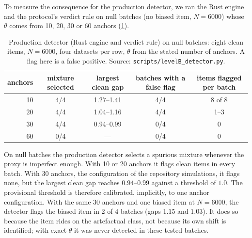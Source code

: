To measure the consequence for the production detector, we ran the Rust engine and the
protocol's verdict rule on null batches (no biased item, $N=6000$) whose $\theta$ comes from 10,
20, 30 or 60 anchors (\cref{tab:anchors}).

\begin{table}[t]
\centering\small
\caption{Production detector (Rust engine and verdict rule) on null batches: eight clean items,
$N=6000$, four datasets per row, $\theta$ from the stated number of anchors. A flag here is a
false positive. Source: \texttt{scripts/levelB\_detector.py}.}
\label{tab:anchors}
\begin{tabular}{@{}rcccc@{}}
\toprule
anchors & mixture selected & largest clean gap & batches with a false flag & items flagged per batch\\
\midrule
10 & 4/4 & 1.27--1.41 & 4/4 & 8 of 8\\
20 & 4/4 & 1.04--1.16 & 4/4 & 1--3\\
30 & 4/4 & 0.94--0.99 & 0/4 & 0\\
60 & 0/4 & --- & 0/4 & 0\\
\bottomrule
\end{tabular}
\end{table}

\begin{finding}\label{find:proxy}\empirical{}
On null batches the production detector selects a spurious mixture whenever the proxy is
imperfect enough. With 10 or 20 anchors it flags clean items in every batch. With 30 anchors,
the configuration of the repository simulations, it flags none, but the largest clean gap
reaches $0.94$--$0.99$ against a threshold of $1.0$. The provisional threshold is therefore
calibrated, implicitly, to one anchor configuration. With the same 30 anchors and one biased
item at $N=6000$, the detector flags the biased item in 2 of 4 batches (gaps $1.15$ and $1.03$).
It does so because the item rides on the artefactual class, not because its own shift is
identified; with exact $\theta$ it was never detected in these tested batches.
\end{finding}

